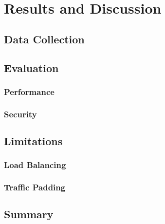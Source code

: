 \chapter{Results and Discussion}\label{Results}

\blindtext









\section{Data Collection}

\blindtext









\section{Evaluation}

\blindtext

\subsection{Performance}

\blindtext

\subsection{Security}

\blindtext









\section{Limitations}

\blindtext

\subsection{Load Balancing}

\blindtext

\subsection{Traffic Padding}

\blindtext









\section{Summary}

\blindtext
